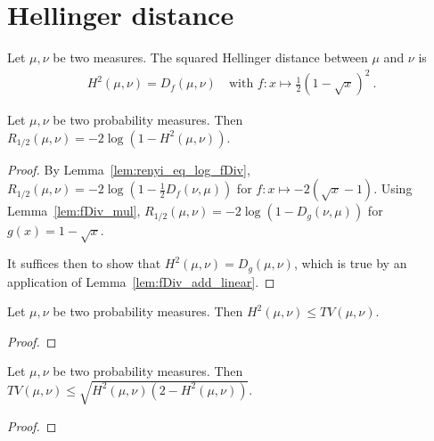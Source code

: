 \chapter{Hellinger distance}

\begin{definition}
  \label{def:Hellinger}
  Let $\mu, \nu$ be two measures. The squared Hellinger distance between $\mu$ and $\nu$ is
  \begin{align*}
    H^2(\mu, \nu) = D_f(\mu, \nu) \quad \text{with } f: x \mapsto \frac{1}{2}\left( 1 - \sqrt{x} \right)^2 \: .
  \end{align*}
\end{definition}

\begin{lemma}
  \label{lem:renyi_half_eq_log_hellinger}
  Let $\mu, \nu$ be two probability measures. Then $R_{1/2}(\mu, \nu) = -2\log(1 - H^2(\mu, \nu))$.
\end{lemma}

\begin{proof}
By Lemma~\ref{lem:renyi_eq_log_fDiv}, $R_{1/2}(\mu, \nu) = -2 \log (1 - \frac{1}{2} D_f(\nu, \mu))$ for $f : x \mapsto -2 (\sqrt{x} - 1)$. Using Lemma~\ref{lem:fDiv_mul}, $R_{1/2}(\mu, \nu) = -2 \log (1 - D_g(\nu, \mu))$ for $g(x) = 1 - \sqrt{x}$.

It suffices then to show that $H^2(\mu, \nu) = D_g(\mu, \nu)$, which is true by an application of Lemma~\ref{lem:fDiv_add_linear}.
\end{proof}

\begin{lemma}
  \label{lem:hellinger_le_tv}
  Let $\mu, \nu$ be two probability measures. Then $H^2(\mu, \nu) \le TV(\mu, \nu)$.
\end{lemma}

\begin{proof}
\end{proof}

\begin{lemma}
  \label{lem:tv_le_hellinger}
  Let $\mu, \nu$ be two probability measures. Then $TV(\mu, \nu) \le \sqrt{H^2(\mu, \nu)(2 - H^2(\mu, \nu))}$.
\end{lemma}

\begin{proof}
\end{proof}

